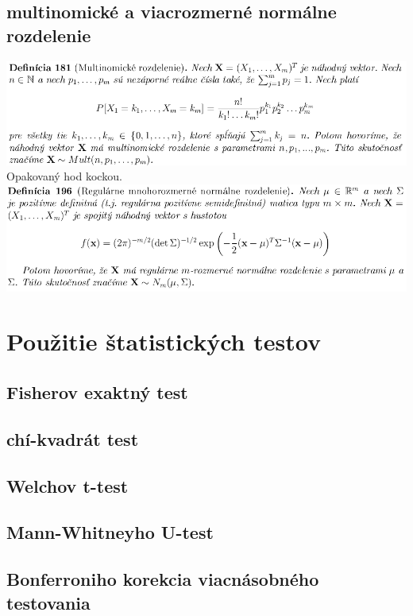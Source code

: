 \subsection {multinomické a viacrozmerné normálne rozdelenie}
\includegraphics[width=1\textwidth]{images/multinom_rozd}\\
Opakovaný hod kockou.\\
\includegraphics[width=1\textwidth]{images/viacrozm_norm_rozd}\\

\section{Použitie štatistických testov}

\subsection {Fisherov exaktný test}
\subsection {chí-kvadrát test}
\subsection {Welchov t-test}
\subsection {Mann-Whitneyho U-test}
\subsection {Bonferroniho korekcia viacnásobného testovania}

